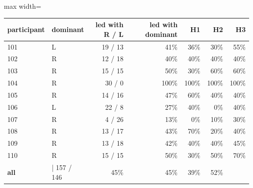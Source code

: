 \begin{adjustbox}{max width=\textwidth}
{\footnotesize
\begin{tabular}{llrrrrr}
\toprule
\textbf{participant} & \textbf{dominant} & \textbf{led with R / L} & \textbf{led with dominant} & \textbf{H1} & \textbf{H2} & \textbf{H3} \\
\midrule
101 & L & 19 / 13 & 41\% & 36\% & 30\% & 55\% \\
102 & R & 12 / 18 & 40\% & 40\% & 40\% & 40\% \\
103 & R & 15 / 15 & 50\% & 30\% & 60\% & 60\% \\
104 & R & 30 / 0 & 100\% & 100\% & 100\% & 100\% \\
105 & R & 14 / 16 & 47\% & 60\% & 40\% & 40\% \\
106 & L & 22 / 8 & 27\% & 40\% & 0\% & 40\% \\
107 & R & 4 / 26 & 13\% & 0\% & 10\% & 30\% \\
108 & R & 13 / 17 & 43\% & 70\% & 20\% & 40\% \\
109 & R & 13 / 18 & 42\% & 40\% & 40\% & 45\% \\
110 & R & 15 / 15 & 50\% & 30\% & 50\% & 70\% \\
\textbf{all} & | 157 / 146 & 45\% & 45\% & 39\% & 52\% &  \\
\bottomrule
\end{tabular}
}
\end{adjustbox}
